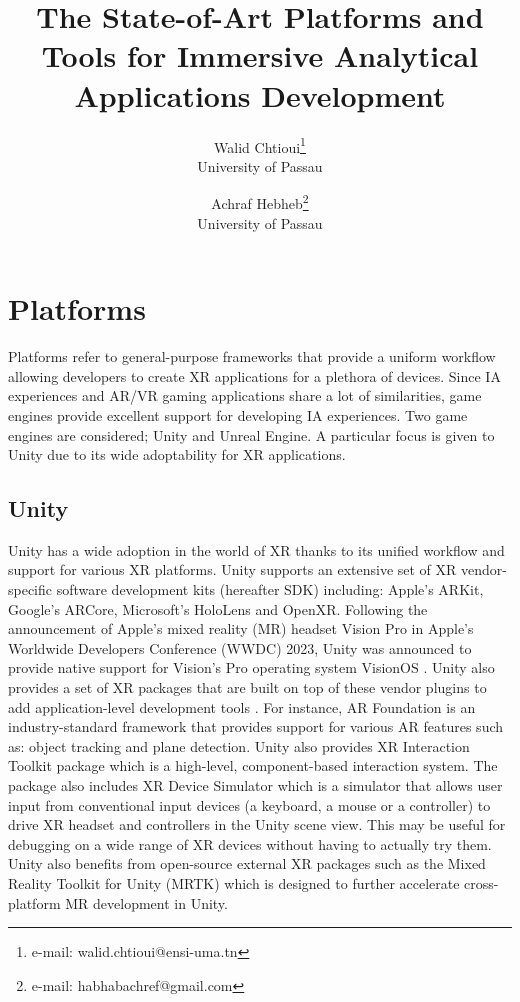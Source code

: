 \documentclass{vgtc}                          %
\title{The State-of-Art Platforms and Tools for Immersive Analytical
Applications Development}
\author{Walid Chtioui\thanks{e-mail: walid.chtioui@ensi-uma.tn}\\ %
        \scriptsize University of Passau %
\and Achraf Hebheb\thanks{e-mail: habhabachref@gmail.com}\\ %
     \scriptsize University of Passau}
\begin{document}
\maketitle



\section{Platforms}

Platforms refer to general-purpose frameworks that provide a uniform workflow
allowing developers to create XR applications for a plethora of devices. Since
IA experiences and AR/VR gaming applications share a lot of similarities, game
engines provide excellent support for developing IA experiences. Two game
engines are considered; Unity and Unreal Engine. A particular focus is given
to Unity due to its wide adoptability for XR applications.

\subsection{Unity}
Unity has a wide adoption in the world of XR thanks to its unified workflow
and support for various XR platforms. Unity supports an extensive set of XR
vendor-specific software development kits (hereafter SDK) including: Apple's
ARKit, Google's ARCore, Microsoft's HoloLens and OpenXR. Following the
announcement of Apple's mixed reality (MR) headset Vision Pro in Apple's
Worldwide Developers Conference (WWDC) 2023, Unity was announced to provide
native support for Vision's Pro operating system VisionOS \cite{web:vision_pro_unity}.
Unity also provides a set of XR packages that are built on top of these vendor
plugins to add application-level development tools \cite{unity:xr_packages}.
For instance, AR Foundation is an industry-standard framework that provides
support for various AR features such as: object tracking and plane detection.
Unity also provides XR Interaction Toolkit package which is a high-level,
component-based interaction system. The package also includes XR Device
Simulator which is a simulator that allows user input from conventional input
devices (a keyboard, a mouse or a controller) to drive XR headset and
controllers in the Unity scene view. This may be useful for debugging on a
wide range of XR devices without having to actually try them. Unity also
benefits from open-source external XR packages such as the Mixed Reality
Toolkit for Unity (MRTK) \cite{mrtk:repo} which is designed to further accelerate cross-platform MR development in Unity.
\end{document}
